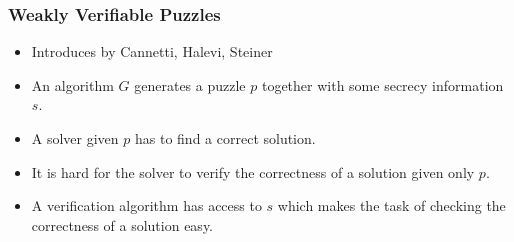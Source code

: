 \documentclass[first,firstsupp,handout,last]{ETHclass}
\begin{document}
\begin{frame}[t]
  \frametitle{Weakly Verifiable Puzzles}
  \begin{itemize}
    \item Introduces by Cannetti, Halevi, Steiner \cite{canetti2005hardness}
    \item An algorithm $G$ generates a puzzle $p$ together with some secrecy information $s$.
    \item A solver given $p$ has to find a correct solution.
    \item It is hard for the solver to verify the correctness of a solution given only $p$.
    \item A verification algorithm has access to $s$ which makes the task of checking the correctness of a solution easy.
  \end{itemize}
  \note{
    \begin{enumerate}
    \end{enumerate}
  }
\end{frame}
\end{document}

